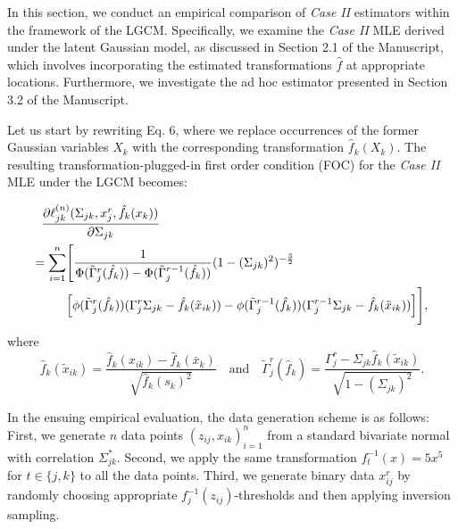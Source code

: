 \begin{change}
    In this section, we conduct an empirical comparison of \textit{Case II} estimators within the framework of the LGCM. Specifically, we examine the \textit{Case II} MLE derived under the latent Gaussian model, as discussed in Section 2.1 of the Manuscript, which involves incorporating the estimated transformations \(\hat{f}\) at appropriate locations. Furthermore, we investigate the ad hoc estimator presented in Section 3.2 of the Manuscript.

    Let us start by rewriting Eq. 6, where we replace occurrences of the former Gaussian variables $X_k$ with the corresponding transformation $\hat{f}_k(X_k)$. The resulting transformation-plugged-in first order condition (FOC) for the \textit{Case II} MLE under the LGCM becomes:

    \begin{align*}
        \MoveEqLeft \frac{\partial\ell_{jk}^{(n)}(\Sigma_{jk}, x_j^r,\hat{f_k}(x_k))}{\partial \Sigma_{jk}}                                                                                                                                 \\
        = \sum_{i=1}^n & \Bigg[\frac{1}{\Phi(\tilde{\Gamma}_j^{r}(\hat{f_k})) - \Phi(\tilde{\Gamma}_j^{r-1}(\hat{f_k}))}(1-(\Sigma_{jk})^2)^{-\frac{3}{2}}                                                                                  \\
                       & \Big[\phi({\tilde{\Gamma}}_j^{r}(\hat{f_k}))({\Gamma}_j^r\Sigma_{jk} - \hat{f_k}(\tilde{x}_{ik})) - \phi({\tilde{\Gamma}}_j^{r-1}(\hat{f_k}))({\Gamma}_j^{r-1}\Sigma_{jk} - \hat{f_k}(\tilde{x}_{ik}))\Big]\Bigg],
    \end{align*}
    where
    \[\hat{f}_k(\tilde{x}_{ik}) = \frac{\hat{f}_k(x_{ik}) - \hat{f}_k(\bar{x}_k)}{\sqrt{\hat{f}_k(s_k)^2}} \quad \text{and} \quad {\tilde{\Gamma}}_j^{r}(\hat{f}_k) = \frac{{\Gamma}_j^{r} - \Sigma_{jk}\hat{f}_k(\tilde{x}_{ik})}{\sqrt{1-(\Sigma_{jk})^2}}.\]

    In the ensuing empirical evaluation, the data generation scheme is as follows: First, we generate \(n\) data points \((z_{ij}, x_{ik})_{i=1}^n\) from a standard bivariate normal with correlation \(\Sigma^*_{jk}\). Second, we apply the same transformation \(f_t^{-1}(x) = 5x^5\) for \(t \in \{j,k\}\) to all the data points. Third, we generate binary data \(x_{ij}^r\) by randomly choosing appropriate \(f^{-1}_j(z_{ij})\)-thresholds and then applying inversion sampling.


\end{change}
